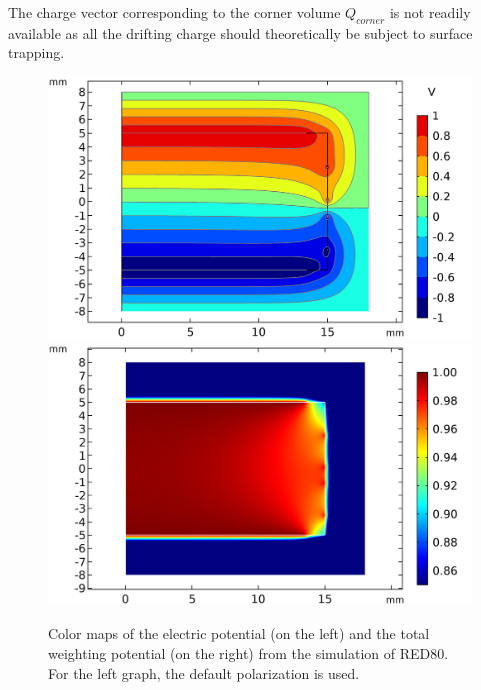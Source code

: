 The charge vector corresponding to the corner volume $Q_{corner}$ is not readily available as all the drifting charge should theoretically be subject to surface trapping.

\begin{figure}
\centering
\includegraphics[scale=0.5]{Figures/ElectrodesExperimental/potential_red80.png}
\includegraphics[scale=0.5]{Figures/ElectrodesExperimental/twp_red80.png}
\caption{Color maps of the electric potential (on the left) and the total weighting potential (on the right) from the simulation of RED80. For the left graph, the default polarization is used.}
\label{fig:red80-potential-twp}
\end{figure}

